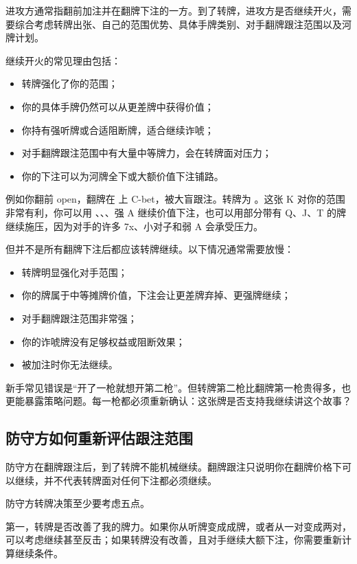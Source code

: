 进攻方通常指翻前加注并在翻牌下注的一方。到了转牌，进攻方是否继续开火，需要综合考虑转牌出张、自己的范围优势、具体手牌类别、对手翻牌跟注范围以及河牌计划。

继续开火的常见理由包括：

\begin{itemize}
\item 转牌强化了你的范围；
\item 你的具体手牌仍然可以从更差牌中获得价值；
\item 你持有强听牌或合适阻断牌，适合继续诈唬；
\item 对手翻牌跟注范围中有大量中等牌力，会在转牌面对压力；
\item 你的下注可以为河牌全下或大额价值下注铺路。
\end{itemize}

例如你翻前 open，翻牌在  上 C-bet，被大盲跟注。转牌为 。这张 K 对你的范围非常有利，你可以用 、、、强 A 继续价值下注，也可以用部分带有 Q、J、T 的牌继续施压，因为对手的许多 7x、小对子和弱 A 会承受压力。

但并不是所有翻牌下注后都应该转牌继续。以下情况通常需要放慢：

\begin{itemize}
\item 转牌明显强化对手范围；
\item 你的牌属于中等摊牌价值，下注会让更差牌弃掉、更强牌继续；
\item 对手翻牌跟注范围非常强；
\item 你的诈唬牌没有足够权益或阻断效果；
\item 被加注时你无法继续。
\end{itemize}

新手常见错误是“开了一枪就想开第二枪”。但转牌第二枪比翻牌第一枪贵得多，也更能暴露策略问题。每一枪都必须重新确认：这张牌是否支持我继续讲这个故事？

\subsection{防守方如何重新评估跟注范围}

防守方在翻牌跟注后，到了转牌不能机械继续。翻牌跟注只说明你在翻牌价格下可以继续，并不代表转牌面对任何下注都必须继续。

防守方转牌决策至少要考虑五点。

第一，转牌是否改善了我的牌力。如果你从听牌变成成牌，或者从一对变成两对，可以考虑继续甚至反击；如果转牌没有改善，且对手继续大额下注，你需要重新计算继续条件。

